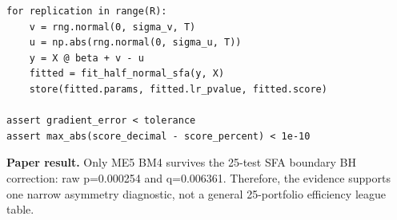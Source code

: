 \begin{verbatim}
for replication in range(R):
    v = rng.normal(0, sigma_v, T)
    u = np.abs(rng.normal(0, sigma_u, T))
    y = X @ beta + v - u
    fitted = fit_half_normal_sfa(y, X)
    store(fitted.params, fitted.lr_pvalue, fitted.score)

assert gradient_error < tolerance
assert max_abs(score_decimal - score_percent) < 1e-10
\end{verbatim}

\textbf{Paper result.} Only ME5 BM4 survives the 25-test SFA boundary BH
correction: raw p=0.000254 and q=0.006361. Therefore, the evidence
supports one narrow asymmetry diagnostic, not a general 25-portfolio
efficiency league table.

